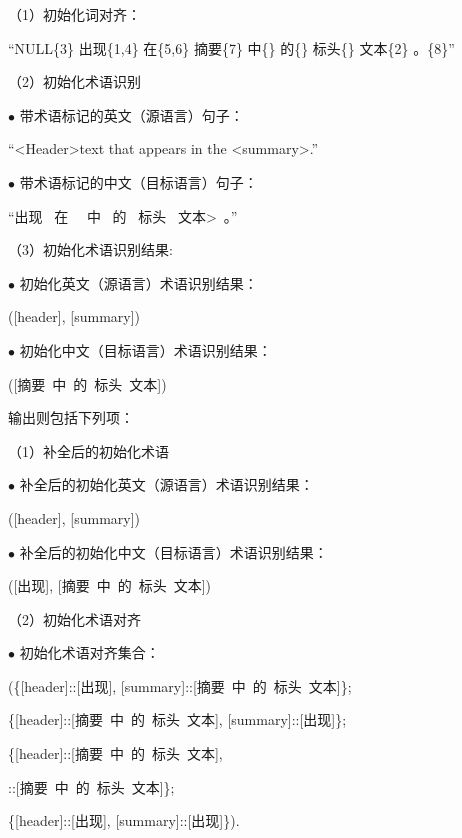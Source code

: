 \begin{center}
	\begin{boxedminipage}[h]{\linewidth}
		\small
		\quad （1）初始化词对齐：
		
		 \qquad\qquad\qquad ``NULL\{3\} 出现\{1,4\} 在\{5,6\} 摘要\{7\} 中\{\} 的\{\} 标头\{\} 文本\{2\} 。\{8\}''
		
		\quad（2）初始化术语识别 
		
		\qquad \qquad $\bullet$ 带术语标记的英文（源语言）句子：
		
		\qquad\qquad\qquad ``\textless Header\textgreater \space text that appears in the \textless summary\textgreater \space.'' 
		
		\qquad \qquad $\bullet$ 带术语标记的中文（目标语言）句子：
		
		\qquad\qquad\qquad ``出现 \  在 \  \ 中 \ 的 \ 标头 \ 文本\textgreater \ 。''
		
		\quad （3）初始化术语识别结果:
		
		\qquad \qquad $\bullet$ 初始化英文（源语言）术语识别结果：
		
		\qquad\qquad\qquad ([header], [summary])
		
		\qquad \qquad $\bullet$ 初始化中文（目标语言）术语识别结果：
		
		\qquad\qquad\qquad ([摘要\ 中\ 的\ 标头\ 文本])
	\end{boxedminipage}
\end{center}

输出则包括下列项：

\begin{center}
	\begin{boxedminipage}[h]{\linewidth}
		\small
		\quad （1）补全后的初始化术语
		
		\qquad \qquad $\bullet$ 补全后的初始化英文（源语言）术语识别结果：
		
		\qquad\qquad\qquad ([header], [summary])
		
		\qquad \qquad $\bullet$ 补全后的初始化中文（目标语言）术语识别结果：
		
		\qquad\qquad\qquad ([出现], [摘要\ 中\ 的\ 标头\ 文本])
		
		\quad （2）初始化术语对齐
		
		\qquad \qquad $\bullet$ 初始化术语对齐集合：
		
		\qquad\qquad\qquad (\{[header]::[出现], [summary]::[摘要\ 中\ 的\ 标头\ 文本]\}; 
		
		\qquad\qquad\qquad \{[header]::[摘要\ 中\ 的\ 标头\ 文本], [summary]::[出现]\}; 
		
		\qquad\qquad\qquad \{[header]::[摘要\ 中\ 的\ 标头\ 文本], 
		
		\qquad\qquad\qquad\qquad [summary]::[摘要\ 中\ 的\ 标头\ 文本]\};
		
		\qquad\qquad\qquad \{[header]::[出现], [summary]::[出现]\}).
	\end{boxedminipage}
\end{center}


